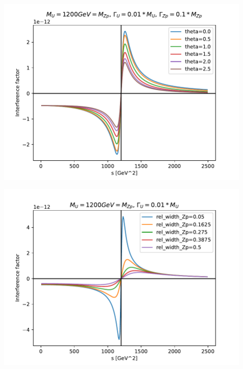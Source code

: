 \documentclass{../bredelebeamer}
\begin{document}
\begin{frame}
    \begin{center}
        \includegraphics[width=0.95\textwidth]{interference_by_theta.pdf}    
    \end{center}
    
\end{frame}
\begin{frame}
    \begin{center}
        \includegraphics[width=0.95\textwidth]{interference_by_rel_width_Zp.pdf}
    \end{center}
\end{frame}
\end{document}
